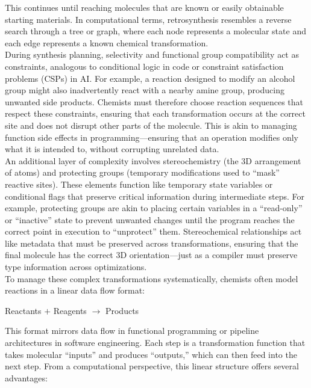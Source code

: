 \documentclass[12pt]{article}
\begin{document}
This continues until reaching molecules that are known or easily obtainable starting materials.
In computational terms, retrosynthesis resembles a reverse search through a tree or graph, where each node represents a molecular state and each edge represents a known chemical transformation.
\\
\indent
During synthesis planning, selectivity and functional group compatibility act as constraints, analogous to conditional logic in code or constraint satisfaction problems (CSPs) in AI.
For example, a reaction designed to modify an alcohol group might also inadvertently react with a nearby amine group, producing unwanted side products.
Chemists must therefore choose reaction sequences that respect these constraints, ensuring that each transformation occurs at the correct site and does not disrupt other parts of the molecule.
This is akin to managing function side effects in programming—ensuring that an operation modifies only what it is intended to, without corrupting unrelated data.
\\
\indent
An additional layer of complexity involves stereochemistry (the 3D arrangement of atoms) and protecting groups (temporary modifications used to “mask” reactive sites).
These elements function like temporary state variables or conditional flags that preserve critical information during intermediate steps.
For example, protecting groups are akin to placing certain variables in a “read-only” or “inactive” state to prevent unwanted changes until the program reaches the correct point in execution to “unprotect” them.
Stereochemical relationships act like metadata that must be preserved across transformations, ensuring that the final molecule has the correct 3D orientation—just as a compiler must preserve type information across optimizations.
\\
\indent
To manage these complex transformations systematically, chemists often model reactions in a linear data flow format:
\\
\begin{center}
{Reactants $+$ Reagents $\rightarrow$ Products}
\end{center}
\indent
This format mirrors data flow in functional programming or pipeline architectures in software engineering.
Each step is a transformation function that takes molecular “inputs” and produces “outputs,” which can then feed into the next step.
From a computational perspective, this linear structure offers several advantages:
\end{document}
